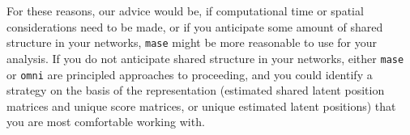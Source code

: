 For these reasons, our advice would be, if computational time or spatial considerations need to be made, or if you anticipate some amount of shared structure in your networks, \texttt{mase} might be more reasonable to use for your analysis. If you do not anticipate shared structure in your networks, either \texttt{mase} or \texttt{omni} are principled approaches to proceeding, and you could identify a strategy on the basis of the representation (estimated shared latent position matrices and unique score matrices, or unique estimated latent positions) that you are most comfortable working with.

\newpage